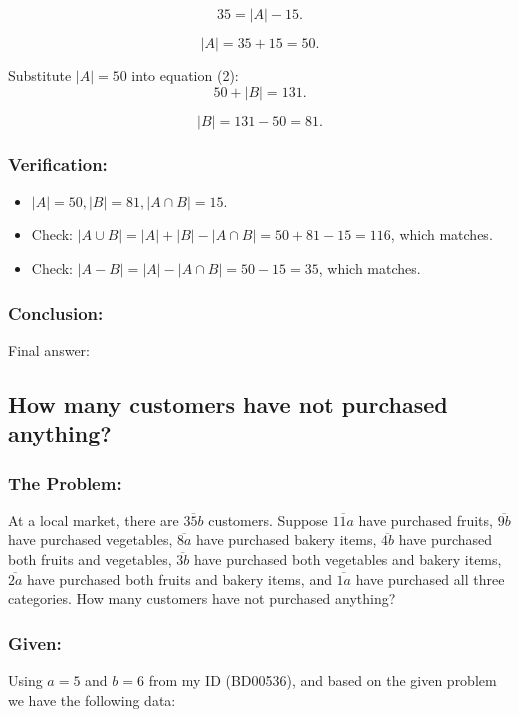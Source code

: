 \documentclass[12pt, a4paper, twoside]{report} %
\begin{document}
  \[
  35 = |A| - 15.
  \]

  \[
  |A| = 35 + 15 = 50.
  \]

  Substitute \( |A| = 50 \) into equation (2):
  \[
  50 + |B| = 131.
  \]

  \[
  |B| = 131 - 50 = 81.
  \]

\subsubsection*{Verification:}
  \begin{itemize}
    \item $|A|=50, |B|=81,|A\cap B|=15$.
    \item Check: $|A \cup B| = |A| + |B| - |A \cap B| = 50 + 81 - 15 = 116$, which matches.
    \item Check: $|A - B| = |A| - |A \cap B| = 50 - 15 = 35$, which matches.
  \end{itemize}

\subsubsection*{Conclusion:}
Final answer: 

\subsection{How many customers have not purchased anything?}

\subsubsection*{The Problem:}
At a local market, there are $\overline {35b}$ customers. Suppose $\overline {11a}$ have purchased fruits, $\overline {9b}$ have purchased vegetables, $\overline {8a}$ have purchased bakery items, $\overline{4b}$ have purchased both fruits and vegetables, $\overline{3b}$ have purchased both vegetables and bakery items, $\overline{2a}$ have purchased both fruits and bakery items, and $\overline{1a}$ have purchased all three categories. How many customers have not purchased anything?
\subsubsection*{Given:}
  Using \(a = 5\) and \(b = 6\) from my ID (BD00536), and based on the given problem we have the following data:
\end{document}
